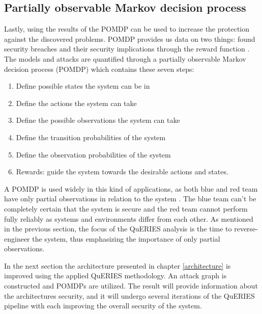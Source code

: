 \subsection{Partially observable Markov decision process}

Lastly, using the results of the POMDP can be used to increase the
protection against the discovered problems. POMDP provides us data on
two things: found security breaches and their security implications
through the reward function \cite{carin2008cybersecurity}.  The models
and attacks are quantified through a partially observable Markov
decision process (POMDP) which contains these seven steps:

\begin{enumerate}
    \item Define possible states the system can be in
    \item Define the actions the system can take
    \item Define the possible observations the system can take
    \item Define the transition probabilities of the system
    \item Define the observation probabilities of the system
    \item Rewards: guide the system towards the desirable actions and
      states.
\end{enumerate} \cite{hughes2013quantitative}

A POMDP is used widely in this kind of applications, as both blue and
red team have only partial observations in relation to the system
\cite{mcabeeMarkov}. The blue team can't be completely certain that
the system is secure and the red team cannot perform fully reliably as
systems and environments differ from each other. As mentioned in the
previous section, the focus of the QuERIES analysis is the time to
reverse-engineer the system, thus emphasizing the importance of only
partial observations.

In the next section the architecture presented in chapter
\ref{architecture} is improved using the applied QuERIES methodology. An
attack graph is constructed and POMDPs are utilized. The result will
provide information about the architectures security, and it will
undergo several iterations of the QuERIES pipeline with each improving
the overall security of the system.
